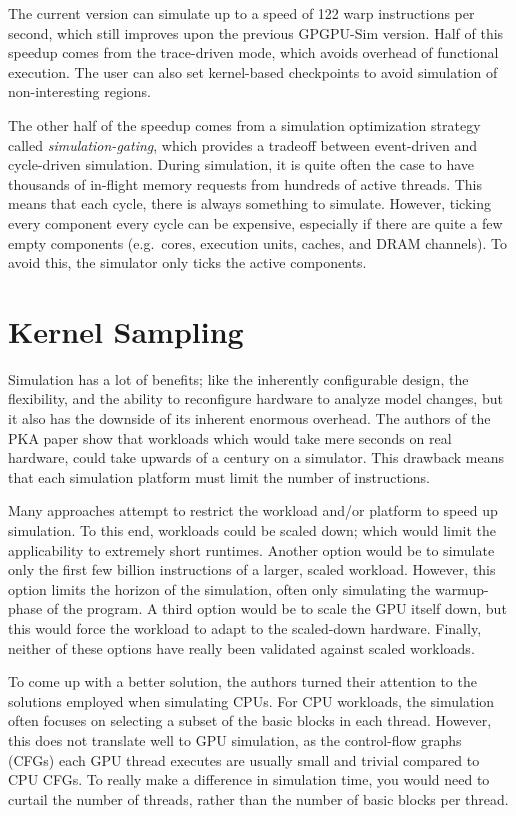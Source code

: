 The current version can simulate up to a speed of 122 warp instructions per second, which still improves upon the previous GPGPU-Sim version.
Half of this speedup comes from the trace-driven mode, which avoids overhead of functional execution.
The user can also set kernel-based checkpoints to avoid simulation of non-interesting regions.

The other half of the speedup comes from a simulation optimization strategy called \textit{simulation-gating}, which provides a tradeoff between event-driven and cycle-driven simulation.
During simulation, it is quite often the case to have thousands of in-flight memory requests from hundreds of active threads.
This means that each cycle, there is always something to simulate.
However, ticking every component every cycle can be expensive, especially if there are quite a few empty components (e.g.\ cores, execution units, caches, and DRAM channels).
To avoid this, the simulator only ticks the active components.

\section{Kernel Sampling}\label{sec:kernel-sampling}
Simulation has a lot of benefits; like the inherently configurable design, the flexibility, and the ability to reconfigure hardware to analyze model changes, but it also has the downside of its inherent enormous overhead.
The authors of the PKA paper\cite{pks} show that workloads which would take mere seconds on real hardware, could take upwards of a century on a simulator.
This drawback means that each simulation platform must limit the number of instructions.

Many approaches attempt to restrict the workload and/or platform to speed up simulation.
To this end, workloads could be scaled down; which would limit the applicability to extremely short runtimes.
Another option would be to simulate only the first few billion instructions of a larger, scaled workload.
However, this option limits the horizon of the simulation, often only simulating the warmup-phase of the program.
A third option would be to scale the GPU itself down, but this would force the workload to adapt to the scaled-down hardware.
Finally, neither of these options have really been validated against scaled workloads.

To come up with a better solution, the authors turned their attention to the solutions employed when simulating CPUs.
For CPU workloads, the simulation often focuses on selecting a subset of the basic blocks in each thread.
However, this does not translate well to GPU simulation, as the control-flow graphs (CFGs) each GPU thread executes are usually small and trivial compared to CPU CFGs.
To really make a difference in simulation time, you would need to curtail the number of threads, rather than the number of basic blocks per thread.

